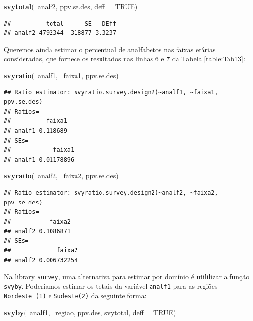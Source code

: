 \documentclass[]{book}
\newenvironment{Shaded}{\begin{snugshade}}{\end{snugshade}}
\newcommand{\KeywordTok}[1]{\textcolor[rgb]{0.13,0.29,0.53}{\textbf{{#1}}}}
\newcommand{\DataTypeTok}[1]{\textcolor[rgb]{0.13,0.29,0.53}{{#1}}}
\newcommand{\OtherTok}[1]{\textcolor[rgb]{0.56,0.35,0.01}{{#1}}}
\newcommand{\NormalTok}[1]{{#1}}
\numberwithin{example}{chapter}
\numberwithin{remark}{chapter}
\numberwithin{definition}{chapter}
\begin{document}
\begin{Shaded}
\begin{Highlighting}[]
\KeywordTok{svytotal}\NormalTok{(~analf2, ppv.se.des, }\DataTypeTok{deff =} \OtherTok{TRUE}\NormalTok{)}
\end{Highlighting}
\end{Shaded}

\begin{verbatim}
##          total      SE   DEff
## analf2 4792344  318877 3.3237
\end{verbatim}

Queremos ainda estimar o percentual de analfabetos nas faixas etárias
consideradas, que fornece os resultados nas linhas 6 e 7 da Tabela
\ref{table:Tab13}:

\begin{Shaded}
\begin{Highlighting}[]
\KeywordTok{svyratio}\NormalTok{(~analf1, ~faixa1, ppv.se.des)}
\end{Highlighting}
\end{Shaded}

\begin{verbatim}
## Ratio estimator: svyratio.survey.design2(~analf1, ~faixa1, ppv.se.des)
## Ratios=
##          faixa1
## analf1 0.118689
## SEs=
##            faixa1
## analf1 0.01178896
\end{verbatim}

\begin{Shaded}
\begin{Highlighting}[]
\KeywordTok{svyratio}\NormalTok{(~analf2, ~faixa2, ppv.se.des)}
\end{Highlighting}
\end{Shaded}

\begin{verbatim}
## Ratio estimator: svyratio.survey.design2(~analf2, ~faixa2, ppv.se.des)
## Ratios=
##           faixa2
## analf2 0.1086871
## SEs=
##             faixa2
## analf2 0.006732254
\end{verbatim}

Na library \texttt{survey}, uma alternativa para estimar por domínio é
utililizar a função \texttt{svyby}. Poderíamos estimar os totais da
variável \texttt{analf1} para as regiões \texttt{Nordeste\ (1)} e
\texttt{Sudeste(2)} da seguinte forma:

\begin{Shaded}
\begin{Highlighting}[]
\KeywordTok{svyby}\NormalTok{(~analf1, ~regiao, ppv.des, svytotal, }\DataTypeTok{deff =} \OtherTok{TRUE}\NormalTok{)}
\end{Highlighting}
\end{Shaded}
\end{document}
